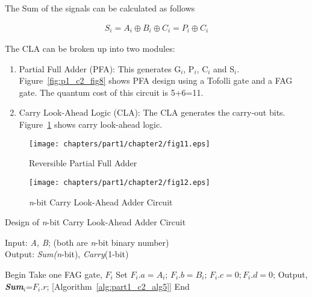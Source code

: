 \noindent The Sum of the signals can be calculated as follows  

\begin{align*}
{ S{}_{i} = A{}_{i}}{\oplus }{  B{}_{i}}{\oplus }{  C{}_{i} = P{}_{i}}{\oplus }{  C{}_{i}}
\end{align*}

The CLA can be broken up into two modules: 
\begin{enumerate}
	\item Partial Full Adder (PFA): This generates G${}_{i}$, P${}_{i}$, C${}_{i}$ and S${}_{i}$. Figure~\ref{fig:p1_c2_fig8} shows PFA design using a Tofolli gate and a FAG gate. The quantum cost of this circuit is 5+6=11.
	\item Carry Look-Ahead Logic (CLA): The CLA generates the carry-out bits. Figure~\ref{fig:p1_c2_fig11} shows carry look-ahead logic.
\end{enumerate}

\begin{figure}[!tbh]
	\centering
	\texttt{[image: chapters/part1/chapter2/fig11.eps]}
	\caption{Reversible Partial Full Adder}
	\label{fig:p1_c2_fig11}
\end{figure}

\begin{figure}[!tbh]
	\centering
	\texttt{[image: chapters/part1/chapter2/fig12.eps]}
	\caption{{\it n}-bit Carry Look-Ahead Adder Circuit}
	\label{fig:p1_c2_fig12}
\end{figure}
\begin{algorithm}[!tbh]
	\caption{Design of {\it n}-bit Carry Look-Ahead Adder Circuit}
	\label{alg:part1_c2_alg4}
	Input: { { \textit{A, B}; (both are \textit{n}-bit binary number)}}\\
	Output: {{\textit{Sum(n}-bit), \textit{Carry}(1-bit)}}
	\begin{algorithmic}[1]
		
		\STATE Begin
		\STATE Take one FAG gate, $F{}_{i}$
		\STATE Set $F{}_{i}.a=A{}_{i}$; $F{}_{i}.b=B{}_{i}$; $F{}_{i}.c=0; F{}_{i}.d=0$;
		\STATE  Output, {\bf {\it Sum${}_{i}$}}=$F{}_{i}.r$; 
		\ENDFOR
		 [Algorithm~\ref{alg:part1_c2_alg5}]
		\STATE End
	\end{algorithmic}
\end{algorithm}



